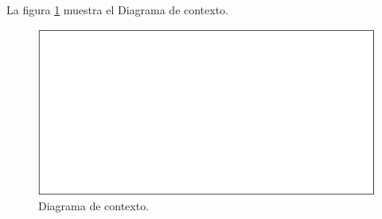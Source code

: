   \paragraph{}La figura \ref{diagramaContexto} muestra el Diagrama de contexto.

        \begin{figure}[!ht]
            \begin{center}
            \includegraphics[]{08.Analisis_Funcional/8.2.DFDs/Niveles/Diagramas/diagrama_contexto.pdf}
            \caption{Diagrama de contexto.}
            \label{diagramaContexto}
            \end{center}
         \end{figure}